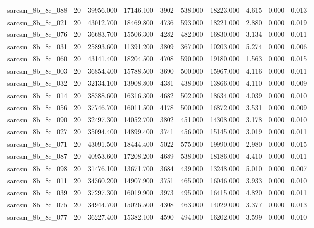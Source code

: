 \begin{tabular}{lrrrrrrrrr}
sarcsm\_8b\_8c\_088 & 20 & 39956.000 & 17146.100 & 3902 & 538.000 & 18223.000 & 4.615 & 0.000 & 0.013 \\
sarcsm\_8b\_8c\_021 & 20 & 43012.700 & 18469.800 & 4736 & 593.000 & 18221.000 & 2.880 & 0.000 & 0.019 \\
sarcsm\_8b\_8c\_076 & 20 & 36683.700 & 15506.300 & 4282 & 482.000 & 16830.000 & 3.134 & 0.000 & 0.011 \\
sarcsm\_8b\_8c\_031 & 20 & 25893.600 & 11391.200 & 3809 & 367.000 & 10203.000 & 5.274 & 0.000 & 0.006 \\
sarcsm\_8b\_8c\_060 & 20 & 43141.400 & 18204.500 & 4708 & 590.000 & 19180.000 & 1.563 & 0.000 & 0.015 \\
sarcsm\_8b\_8c\_003 & 20 & 36854.400 & 15788.500 & 3690 & 500.000 & 15967.000 & 4.116 & 0.000 & 0.011 \\
sarcsm\_8b\_8c\_032 & 20 & 32134.100 & 13908.800 & 4381 & 438.000 & 13866.000 & 4.110 & 0.000 & 0.009 \\
sarcsm\_8b\_8c\_014 & 20 & 38388.600 & 16316.300 & 4682 & 502.000 & 18634.000 & 4.039 & 0.000 & 0.010 \\
sarcsm\_8b\_8c\_056 & 20 & 37746.700 & 16011.500 & 4178 & 500.000 & 16872.000 & 3.531 & 0.000 & 0.009 \\
sarcsm\_8b\_8c\_090 & 20 & 32497.300 & 14052.700 & 3802 & 451.000 & 14308.000 & 3.178 & 0.000 & 0.010 \\
sarcsm\_8b\_8c\_027 & 20 & 35094.400 & 14899.400 & 3741 & 456.000 & 15145.000 & 3.019 & 0.000 & 0.011 \\
sarcsm\_8b\_8c\_071 & 20 & 43091.500 & 18444.400 & 5022 & 575.000 & 19990.000 & 2.980 & 0.000 & 0.015 \\
sarcsm\_8b\_8c\_087 & 20 & 40953.600 & 17208.200 & 4689 & 538.000 & 18186.000 & 4.410 & 0.000 & 0.011 \\
sarcsm\_8b\_8c\_098 & 20 & 31476.100 & 13671.700 & 3684 & 439.000 & 13248.000 & 5.010 & 0.000 & 0.007 \\
sarcsm\_8b\_8c\_011 & 20 & 34360.200 & 14907.900 & 3751 & 465.000 & 16046.000 & 3.933 & 0.000 & 0.010 \\
sarcsm\_8b\_8c\_039 & 20 & 37297.300 & 16019.900 & 3973 & 495.000 & 16415.000 & 4.820 & 0.000 & 0.011 \\
sarcsm\_8b\_8c\_075 & 20 & 34944.700 & 15026.500 & 4308 & 463.000 & 14029.000 & 3.377 & 0.000 & 0.013 \\
sarcsm\_8b\_8c\_077 & 20 & 36227.400 & 15382.100 & 4590 & 494.000 & 16202.000 & 3.599 & 0.000 & 0.010 \\

\end{tabular}
